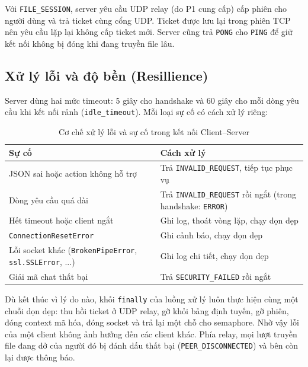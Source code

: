 Với \texttt{FILE\_SESSION}, server yêu cầu UDP relay (do P1 cung cấp) cấp phiên cho người dùng và trả ticket cùng cổng UDP. Ticket được lưu lại trong phiên TCP nên yêu cầu lặp lại không cấp ticket mới. Server cũng trả \texttt{PONG} cho \texttt{PING} để giữ kết nối không bị đóng khi đang truyền file lâu.

\subsection{Xử lý lỗi và độ bền (Resillience)}
Server dùng hai mức timeout: 5 giây cho handshake và 60 giây cho mỗi dòng yêu cầu khi kết nối rảnh (\texttt{idle\_timeout}). Mỗi loại sự cố có cách xử lý riêng:


\begin{table}[H]
    \centering
    \renewcommand{\arraystretch}{1.3}

    \begin{tabularx}{\textwidth}{@{} >{\raggedright\arraybackslash}X >{\raggedright\arraybackslash}X @{}}
        \toprule
        \textbf{Sự cố} & \textbf{Cách xử lý} \\
        \midrule

        JSON sai hoặc action không hỗ trợ
        & Trả \texttt{INVALID\_REQUEST}, tiếp tục phục vụ \\

        Dòng yêu cầu quá dài
        & Trả \texttt{INVALID\_REQUEST} rồi ngắt (trong handshake: \texttt{ERROR}) \\

        Hết timeout hoặc client ngắt
        & Ghi log, thoát vòng lặp, chạy dọn dẹp \\

        \texttt{ConnectionResetError}
        & Ghi cảnh báo, chạy dọn dẹp \\

        Lỗi socket khác (\texttt{BrokenPipeError}, \texttt{ssl.SSLError}, ...)
        & Ghi log chi tiết, chạy dọn dẹp \\

        Giải mã chat thất bại
        & Trả \texttt{SECURITY\_FAILED} rồi ngắt \\

        \bottomrule
    \end{tabularx}
    \caption{Cơ chế xử lý lỗi và sự cố trong kết nối Client--Server}
\end{table}

Dù kết thúc vì lý do nào, khối \texttt{finally} của luồng xử lý luôn thực hiện cùng một chuỗi dọn dẹp: thu hồi ticket ở UDP relay, gỡ khỏi bảng định tuyến, gỡ phiên, đóng context mã hóa, đóng socket và trả lại một chỗ cho semaphore. Nhờ vậy lỗi của một client không ảnh hưởng đến các client khác. Phía relay, mọi lượt truyền file đang dở của người đó bị đánh dấu thất bại (\texttt{PEER\_DISCONNECTED}) và bên còn lại được thông báo.

